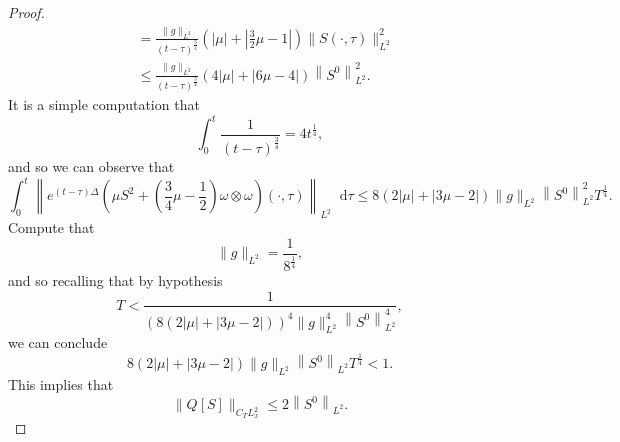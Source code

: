 \documentclass[11pt]{article}
\theoremstyle{plain}
\theoremstyle{remark}
\numberwithin{equation}{section}
\newcommand{\diff}{\mathop{}\!\mathrm{d}}
\begin{document}
\begin{proof}
\begin{align}
    &=
    \frac{\|g\|_{L^2}}{(t-\tau)^\frac{3}{4}}
    \left(|\mu|
    +\left|\frac{3}{2}\mu-1\right|\right)
    \|S(\cdot,\tau)\|_{L^2}^2 \\
    &\leq 
    \frac{\|g\|_{L^2}}{(t-\tau)^\frac{3}{4}}
    \left(4|\mu|
    +\left|6\mu-4\right|\right)
    \left\|S^0\right\|_{L^2}^2.
\end{align}
It is a simple computation that
\begin{equation}
    \int_0^t\frac{1}{(t-\tau)^\frac{3}{4}}
    =4t^\frac{1}{4},
\end{equation}
and so we can observe that
\begin{equation}
    \int_0^t \left\|
     e^{(t-\tau)\Delta}
    \left(\mu S^2+ 
    \left(\frac{3}{4}\mu-\frac{1}{2}\right)
\omega\otimes\omega \right)(\cdot,\tau)
    \right\|_{L^2} \diff\tau
    \leq   
    8\left(2|\mu|
    +\left|3\mu-2\right|\right)
    \|g\|_{L^2}
    \left\|S^0\right\|_{L^2}^2
    T^\frac{1}{4}.
\end{equation}
Compute that
\begin{equation}
    \|g\|_{L^2}
    =
    \frac{1}{8^\frac{1}{4}},
\end{equation}
and so recalling that by hypothesis
\begin{equation}
T<\frac{1}
    {\left(8\left(2|\mu|
    +\left|3\mu-2\right|\right)\right)^4
    \|g\|_{L^2}^4
    \left\|S^0\right\|_{L^2}^4},
\end{equation}
we can conclude
\begin{equation}
    8\left(2|\mu|
    +\left|3\mu-2\right|\right)
    \|g\|_{L^2}
    \left\|S^0\right\|_{L^2}
    T^\frac{1}{4}
    <1.
\end{equation}
This implies that
\begin{equation}
    \|Q[S]\|_{C_T L^2_x}
    \leq 
    2\left\|S^0\right\|_{L^2}.
\end{equation}



\end{proof}
\end{document}
